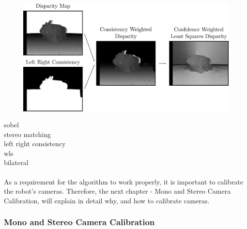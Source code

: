 \begin{figure}[h]
	\centering
	\includegraphics[scale=.28]{chapters/03_background/img/weighted_least_squares_disparity.png}
	\caption{}
	\label{fig::323_weighted_least_squares_disparity}
\end{figure}
\cite{sobel2014an}   sobel\\
\cite{hamzah2010sum} stereo matching\\
\cite{egnal2004stereo} left right consistency\\
\cite{min2014fast}   wls\\
\cite{tomasi1998bilateral} bilateral
\\\\
As a requirement for the algorithm to work properly, it is important to calibrate the robot's cameras. Therefore, the next chapter - Mono and Stereo Camera Calibration, will explain in detail why, and how to calibrate cameras.
\subsubsection{Mono and Stereo Camera Calibration}